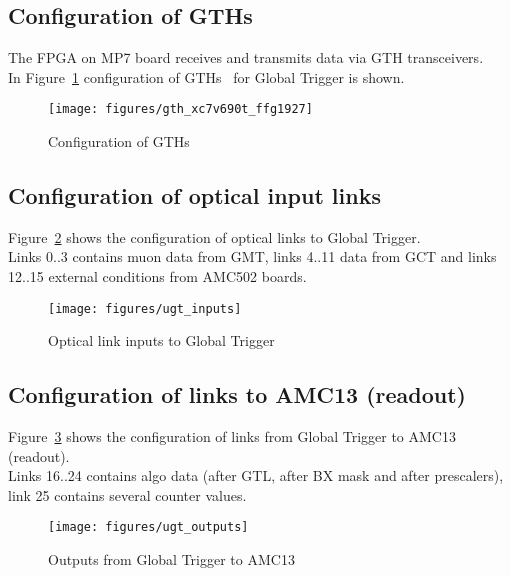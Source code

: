\clearpage
\subsection{Configuration of GTHs}\label{sec:app:app_a}

The FPGA on MP7 board receives and transmits data via GTH transceivers.\\
In Figure~\ref{fig:app:gth_conf} configuration of GTHs~\cite{GTHs} for Global Trigger is shown.

\begin{figure}[htb]
\centering
\texttt{[image: figures/gth\_xc7v690t\_ffg1927]}
\caption{Configuration of GTHs}
\label{fig:app:gth_conf}
\end{figure}

\clearpage

\subsection{Configuration of optical input links}\label{sec:app:app_b}

Figure~\ref{fig:app:ugt_inputs} shows the configuration of optical links to Global Trigger.\\
Links 0..3 contains muon data from GMT, links 4..11 data from GCT and links 12..15 external conditions
from AMC502 boards.

\begin{figure}[htb]
\centering
\texttt{[image: figures/ugt\_inputs]}
\caption{Optical link inputs to Global Trigger}
\label{fig:app:ugt_inputs}
\end{figure}

\subsection{Configuration of links to AMC13 (readout)}\label{sec:app:app_c}

Figure~\ref{fig:app:ugt_outputs} shows the configuration of links from Global Trigger to AMC13 (readout).\\
Links 16..24 contains algo data (after GTL, after BX mask and after prescalers), link 25 contains several counter values.

\begin{figure}[htb]
\centering
\texttt{[image: figures/ugt\_outputs]}
\caption{Outputs from Global Trigger to AMC13}
\label{fig:app:ugt_outputs}
\end{figure}

\clearpage

